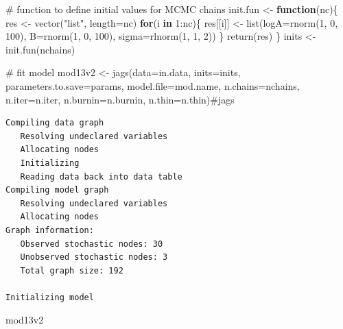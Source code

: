 \documentclass[
  13,
  letterpaper,
]{report}
\newenvironment{Shaded}{\begin{snugshade}}{\end{snugshade}}
\newcommand{\AttributeTok}[1]{\textcolor[rgb]{0.40,0.45,0.13}{#1}}
\newcommand{\CommentTok}[1]{\textcolor[rgb]{0.37,0.37,0.37}{#1}}
\newcommand{\ControlFlowTok}[1]{\textcolor[rgb]{0.00,0.23,0.31}{\textbf{#1}}}
\newcommand{\DecValTok}[1]{\textcolor[rgb]{0.68,0.00,0.00}{#1}}
\newcommand{\FunctionTok}[1]{\textcolor[rgb]{0.28,0.35,0.67}{#1}}
\newcommand{\NormalTok}[1]{\textcolor[rgb]{0.00,0.23,0.31}{#1}}
\newcommand{\OtherTok}[1]{\textcolor[rgb]{0.00,0.23,0.31}{#1}}
\newcommand{\SpecialCharTok}[1]{\textcolor[rgb]{0.37,0.37,0.37}{#1}}
\newcommand{\StringTok}[1]{\textcolor[rgb]{0.13,0.47,0.30}{#1}}
\begin{document}
\begin{Shaded}
\begin{Highlighting}[]
\CommentTok{\# function to define initial values for MCMC chains}
\NormalTok{init.fun }\OtherTok{\textless{}{-}} \ControlFlowTok{function}\NormalTok{(nc)\{}
\NormalTok{    res }\OtherTok{\textless{}{-}} \FunctionTok{vector}\NormalTok{(}\StringTok{"list"}\NormalTok{, }\AttributeTok{length=}\NormalTok{nc)}
    \ControlFlowTok{for}\NormalTok{(i }\ControlFlowTok{in} \DecValTok{1}\SpecialCharTok{:}\NormalTok{nc)\{}
\NormalTok{        res[[i]] }\OtherTok{\textless{}{-}} \FunctionTok{list}\NormalTok{(}\AttributeTok{logA=}\FunctionTok{rnorm}\NormalTok{(}\DecValTok{1}\NormalTok{, }\DecValTok{0}\NormalTok{, }\DecValTok{100}\NormalTok{),}
                         \AttributeTok{B=}\FunctionTok{rnorm}\NormalTok{(}\DecValTok{1}\NormalTok{, }\DecValTok{0}\NormalTok{, }\DecValTok{100}\NormalTok{),}
                         \AttributeTok{sigma=}\FunctionTok{rlnorm}\NormalTok{(}\DecValTok{1}\NormalTok{, }\DecValTok{1}\NormalTok{, }\DecValTok{2}\NormalTok{))}
\NormalTok{    \}}
    \FunctionTok{return}\NormalTok{(res)}
\NormalTok{\}}
\NormalTok{inits }\OtherTok{\textless{}{-}} \FunctionTok{init.fun}\NormalTok{(nchains)}

\CommentTok{\# fit model}
\NormalTok{mod13v2 }\OtherTok{\textless{}{-}} \FunctionTok{jags}\NormalTok{(}\AttributeTok{data=}\NormalTok{in.data, }\AttributeTok{inits=}\NormalTok{inits,}
              \AttributeTok{parameters.to.save=}\NormalTok{params,}
              \AttributeTok{model.file=}\NormalTok{mod.name,}
              \AttributeTok{n.chains=}\NormalTok{nchains, }\AttributeTok{n.iter=}\NormalTok{n.iter,}
              \AttributeTok{n.burnin=}\NormalTok{n.burnin, }\AttributeTok{n.thin=}\NormalTok{n.thin)}\CommentTok{\#jags}
\end{Highlighting}
\end{Shaded}

\begin{verbatim}
Compiling data graph
   Resolving undeclared variables
   Allocating nodes
   Initializing
   Reading data back into data table
Compiling model graph
   Resolving undeclared variables
   Allocating nodes
Graph information:
   Observed stochastic nodes: 30
   Unobserved stochastic nodes: 3
   Total graph size: 192

Initializing model
\end{verbatim}

\begin{Shaded}
\begin{Highlighting}[]
\NormalTok{mod13v2}
\end{Highlighting}
\end{Shaded}
\end{document}
